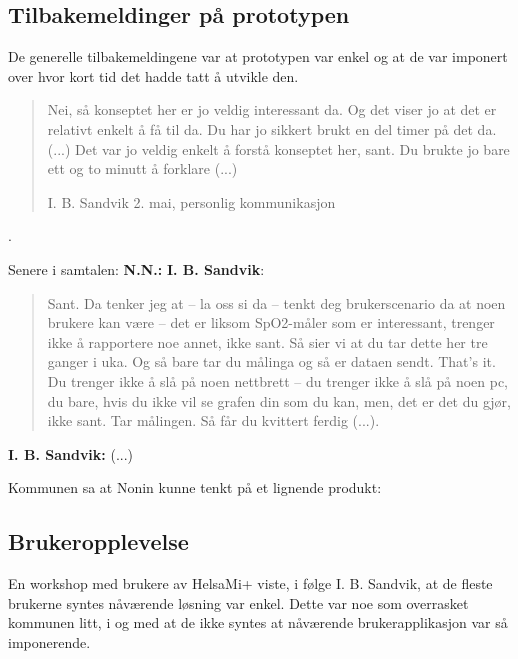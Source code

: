 \subsection{Tilbakemeldinger på prototypen}
De generelle tilbakemeldingene var at prototypen var enkel og at de var imponert over hvor kort tid det hadde tatt å utvikle den.
\blockquote[I. B. Sandvik 2. mai, personlig kommunikasjon]{Nei, så konseptet her er jo veldig interessant da. Og det viser jo at det er relativt enkelt å få til da.
Du har jo sikkert brukt en del timer på det da. (...) Det var jo veldig enkelt å forstå konseptet her, sant. Du brukte jo bare ett og to minutt å forklare (...)}{.}

Senere i samtalen:\newline
\textbf{N.N.:}  \newline
\textbf{I. B. Sandvik}: \blockquote{Sant. Da tenker jeg at -- la oss si da -- tenkt deg brukerscenario da at noen brukere kan være -- det er liksom SpO2-måler som er
    interessant, trenger ikke å rapportere noe annet, ikke sant. Så sier vi at du tar dette her tre ganger i uka. Og så bare tar du målinga og så er dataen sendt. That's
    it. Du trenger ikke å slå på noen nettbrett -- du trenger ikke å slå på noen pc, du bare, hvis du ikke vil se grafen din som du kan, men, det er det du gjør, ikke
sant. Tar målingen. Så får du kvittert ferdig (...).}

\textbf{I. B. Sandvik:}
 (...)

Kommunen sa at Nonin kunne tenkt på et lignende produkt: 

\subsection{Brukeropplevelse}
En workshop med brukere av HelsaMi+ viste, i følge I. B. Sandvik, at de fleste brukerne syntes nåværende løsning var enkel. Dette var noe som overrasket
kommunen litt, i og med at de ikke syntes at nåværende brukerapplikasjon var så imponerende.

